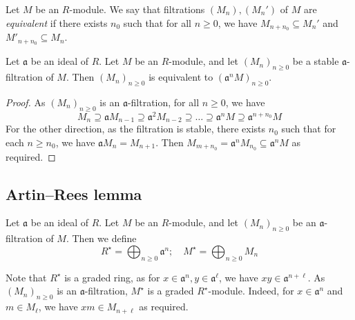 \begin{definition}
    Let \( M \) be an \( R \)-module.
    We say that filtrations \( (M_n), (M_n') \) of \( M \) are \emph{equivalent} if there exists \( n_0 \) such that for all \( n \geq 0 \), we have \( M_{n + n_0} \subseteq M_n' \) and \( M'_{n + n_0} \subseteq M_n \).
\end{definition}
\begin{lemma}
    Let \( \mathfrak a \) be an ideal of \( R \).
    Let \( M \) be an \( R \)-module, and let \( (M_n)_{n \geq 0} \) be a stable \( \mathfrak a \)-filtration of \( M \).
    Then \( (M_n)_{n \geq 0} \) is equivalent to \( (\mathfrak a^n M)_{n \geq 0} \).
\end{lemma}
\begin{proof}
    As \( (M_n)_{n \geq 0} \) is an \( \mathfrak a \)-filtration, for all \( n \geq 0 \), we have
    \[ M_n \supseteq \mathfrak a M_{n-1} \supseteq \mathfrak a^2 M_{n-2} \supseteq \dots \supseteq \mathfrak a^n M \supseteq \mathfrak a^{n + n_0} M \]
    For the other direction, as the filtration is stable, there exists \( n_0 \) such that for each \( n \geq n_0 \), we have \( \mathfrak a M_n = M_{n+1} \).
    Then \( M_{m + n_0} = \mathfrak a^n M_{n_0} \subseteq \mathfrak a^n M \) as required.
\end{proof}

\subsection{Artin--Rees lemma}
\begin{definition}
    Let \( \mathfrak a \) be an ideal of \( R \).
    Let \( M \) be an \( R \)-module, and let \( (M_n)_{n \geq 0} \) be an \( \mathfrak a \)-filtration of \( M \).
    Then we define
    \[ R^\star = \bigoplus_{n \geq 0} \mathfrak a^n;\quad M^\star = \bigoplus_{n \geq 0} M_n \]
\end{definition}
Note that \( R^\star \) is a graded ring, as for \( x \in \mathfrak a^n, y \in \mathfrak a^\ell \), we have \( xy \in \mathfrak a^{n + \ell} \).
As \( (M_n)_{n \geq 0} \) is an \( \mathfrak a \)-filtration, \( M^\star \) is a graded \( R^\star \)-module.
Indeed, for \( x \in \mathfrak a^n \) and \( m \in M_\ell \), we have \( xm \in M_{n + \ell} \) as required.

